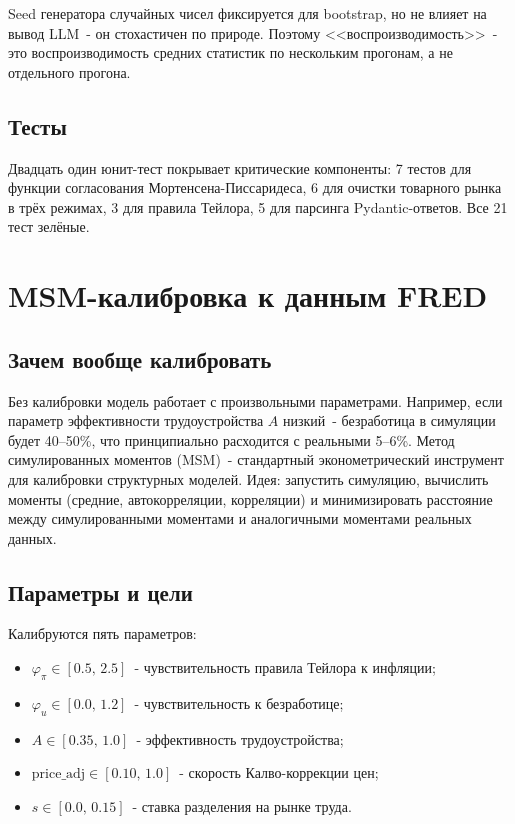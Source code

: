 \documentclass[12pt, a4paper]{article}
\begin{document}
Seed генератора случайных чисел фиксируется для bootstrap, но не влияет на вывод LLM~- он стохастичен по природе. Поэтому <<воспроизводимость>>~- это воспроизводимость средних статистик по нескольким прогонам, а не отдельного прогона.

\subsection{Тесты}

Двадцать один юнит-тест покрывает критические компоненты: 7 тестов для функции согласования Мортенсена-Писсаридеса, 6 для очистки товарного рынка в трёх режимах, 3 для правила Тейлора, 5 для парсинга Pydantic-ответов. Все 21 тест зелёные.

\section{MSM-калибровка к данным FRED}

\subsection{Зачем вообще калибровать}

Без калибровки модель работает с произвольными параметрами. Например, если параметр эффективности трудоустройства $A$ низкий~- безработица в симуляции будет 40--50\%, что принципиально расходится с реальными 5--6\%. Метод симулированных моментов (MSM)~- стандартный эконометрический инструмент для калибровки структурных моделей. Идея: запустить симуляцию, вычислить моменты (средние, автокорреляции, корреляции) и минимизировать расстояние между симулированными моментами и аналогичными моментами реальных данных.

\subsection{Параметры и цели}

Калибруются пять параметров:
\begin{itemize}
  \item $\varphi_{\pi} \in [0.5,\, 2.5]$~- чувствительность правила Тейлора к инфляции;
  \item $\varphi_u \in [0.0,\, 1.2]$~- чувствительность к безработице;
  \item $A \in [0.35,\, 1.0]$~- эффективность трудоустройства;
  \item $\text{price\_adj} \in [0.10,\, 1.0]$~- скорость Калво-коррекции цен;
  \item $s \in [0.0,\, 0.15]$~- ставка разделения на рынке труда.
\end{itemize}
\end{document}
